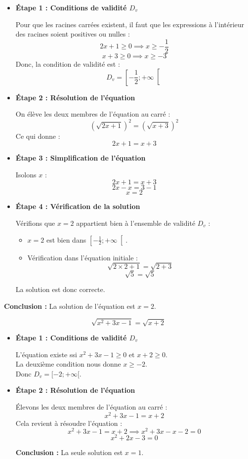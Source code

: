 \documentclass[12pt]{article}
\newcounter{solution}
\begin{document}
\begin{itemize}
    \item \textbf{Étape 1 : Conditions de validité $D_v$}
    
    Pour que les racines carrées existent, il faut que les expressions à l'intérieur des racines soient positives ou nulles :
    \[
    2x + 1 \geq 0 \implies x \geq -\frac{1}{2}
    \]
    \[
    x + 3 \geq 0 \implies x \geq -3
    \]
    Donc, la condition de validité est :
    \[
    D_v = \left[-\frac{1}{2}; +\infty \right[
    \]
    
    \item \textbf{Étape 2 : Résolution de l'équation}
    
    On élève les deux membres de l'équation au carré :
    \[
    (\sqrt{2x + 1})^2 = (\sqrt{x + 3})^2
    \]
    Ce qui donne :
    \[
    2x + 1 = x + 3
    \]
    
    \item \textbf{Étape 3 : Simplification de l'équation}
    
    Isolons $x$ :
    \[
    2x + 1 = x + 3
    \]
    \[
    2x - x = 3 - 1
    \]
    \[
    x = 2
    \]
    
    \item \textbf{Étape 4 : Vérification de la solution}
    
    Vérifions que $x = 2$ appartient bien à l'ensemble de validité $D_v$ :
    
    \begin{itemize}
        \item $x = 2$ est bien dans $\left[-\frac{1}{2}; +\infty \right[$.
        \item Vérification dans l'équation initiale :
        \[
        \sqrt{2 \times 2 + 1} = \sqrt{2 + 3}
        \]
        \[
        \sqrt{5} = \sqrt{5}
        \]
    \end{itemize}
    
    La solution est donc correcte.
    
\end{itemize}

\textbf{Conclusion :} La solution de l'équation est $x = 2$.

\[
\sqrt{x^2 + 3x - 1} = \sqrt{x + 2}
\]

\begin{itemize}
    \item \textbf{Étape 1 : Conditions de validité $D_v$}
    
    L'équation existe ssi $x^2 + 3x - 1 \geq 0$ et $x + 2 \geq 0$.\\
    La deuxième condition nous donne $x \geq -2$.\\
    Donc $D_v = [-2; +\infty[$.
    
    \item \textbf{Étape 2 : Résolution de l'équation}
    
    Élevons les deux membres de l'équation au carré :
    \[
    x^2 + 3x - 1 = x + 2
    \]
    Cela revient à résoudre l'équation :
    \[
    x^2 + 3x - 1 = x + 2 \implies x^2 + 3x - x - 2 = 0
    \]
    \[
    x^2 + 2x - 3 = 0
    \]
    
    \textbf{Conclusion :} La seule solution est $x = 1$.
\end{itemize}
\end{document}
